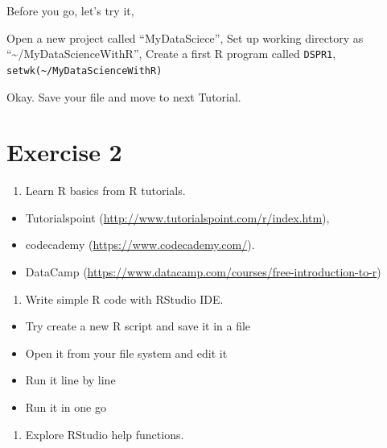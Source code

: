 \documentclass[
]{book}
\providecommand{\tightlist}{%
  \setlength{\itemsep}{0pt}\setlength{\parskip}{0pt}}
\begin{document}
Before you go, let's try it,

\begin{rmdact}
Open a new project called ``MyDataSciece'',
Set up working directory as ``\textasciitilde/MyDataScienceWithR'',
Create a first R program called \texttt{DSPR1},
\texttt{setwk(\textasciitilde{}/MyDataScienceWithR)}
\end{rmdact}

Okay. Save your file and move to next Tutorial.

\hypertarget{exercise-2}{%
\section*{Exercise 2}\label{exercise-2}}


\begin{enumerate}
\def\labelenumi{\arabic{enumi}.}
\tightlist
\item
  Learn R basics from R tutorials.
\end{enumerate}

\begin{itemize}
\tightlist
\item
  Tutorialspoint (\url{http://www.tutorialspoint.com/r/index.htm}),
\item
  codecademy (\url{https://www.codecademy.com/}).
\item
  DataCamp (\url{https://www.datacamp.com/courses/free-introduction-to-r})
\end{itemize}

\begin{enumerate}
\def\labelenumi{\arabic{enumi}.}
\setcounter{enumi}{1}
\tightlist
\item
  Write simple R code with RStudio IDE.
\end{enumerate}

\begin{itemize}
\tightlist
\item
  Try create a new R script and save it in a file
\item
  Open it from your file system and edit it
\item
  Run it line by line
\item
  Run it in one go
\end{itemize}

\begin{enumerate}
\def\labelenumi{\arabic{enumi}.}
\setcounter{enumi}{2}
\tightlist
\item
  Explore RStudio help functions.
\end{enumerate}
\end{document}
